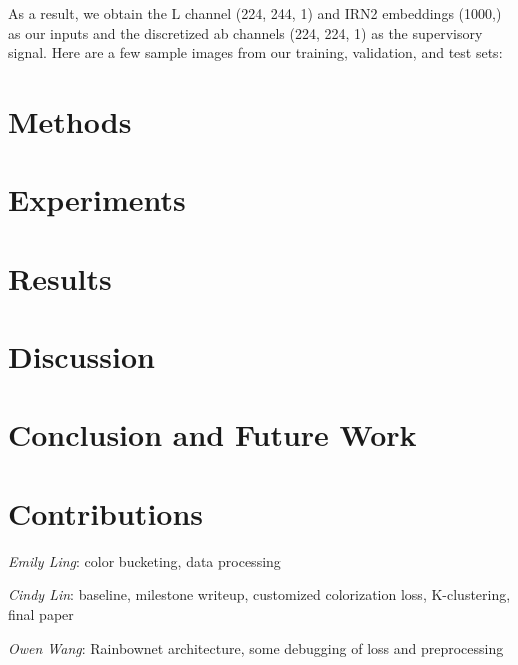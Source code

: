 \documentclass{article} %
\begin{document}
As a result, we obtain the L channel (224, 244, 1) and IRN2 embeddings (1000,) as our inputs and the discretized ab channels (224, 224, 1) as the supervisory signal. Here are a few sample images from our training, validation, and test sets:\\


\section{Methods}



\section{Experiments}

\section{Results}

\section{Discussion}

\section{Conclusion and Future Work}


\section{Contributions}

\emph{Emily Ling}: color bucketing, data processing

\emph{Cindy Lin}: baseline, milestone writeup, customized colorization loss, K-clustering, final paper

\emph{Owen Wang}: Rainbownet architecture, some debugging of loss and preprocessing
\end{document}
